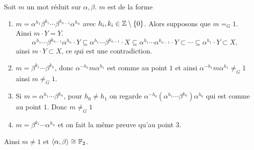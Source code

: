   \begin{preuve}
    Soit $m$ un mot réduit sur $\alpha, \beta$. $m$ est de la forme
    \begin{enumerate}
    \item $m = \alpha^{h_1} \beta^{k_1} \cdots \beta^{k_{n-1}} \alpha^{h_n}$ avec $h_i, k_i \in \mathbb{Z} \setminus
      \{0\}$.
        Alors supposons que $m =_G 1$. Ainsi $m \cdot Y = Y$.
          \[\alpha^{h_1} \cdots \beta^{k_{n-1}} \alpha^{h_n} \cdot Y \subseteq \alpha^{h_1} \cdots
          \beta^{k_{n-1}} \cdot X \subseteq \alpha^{h_1} \cdots \alpha^{k_{n-1}} \cdot Y \subset \cdots
          \subseteq \alpha^{h_1} \cdot Y\subset X,\]
        ainsi $m \cdot Y \subset X$, ce qui est une contradiction.

      \item $m = \beta^{k_1} \cdots \beta^{k_n}$, donc $\alpha^{-h_1}m\alpha^{h_1}$ est comme au point $1$ et
        ainsi $\alpha^{-h_1} m \alpha^{h_1} \neq_G 1$ ainsi $m \neq_G 1$.

      \item Si $m = \alpha^{h_1} \cdots \beta^{k_n}$, pour $h_0 \neq h_1$ on regarde
        $\alpha^{-h_0}(\alpha^{h_1} \cdots \beta^{k_n})\alpha^{h_0}$ qui est comme au point $1$. Donc $m
        \neq_G 1$

      \item $m = \beta^{k_1} \cdots \alpha^{h_n}$ et on fait la même preuve qu'au point 3.
    \end{enumerate}
    Ainsi $m \neq 1$ et $\langle \alpha, \beta \rangle \cong \mathbb{F}_2$.
  \end{preuve}

